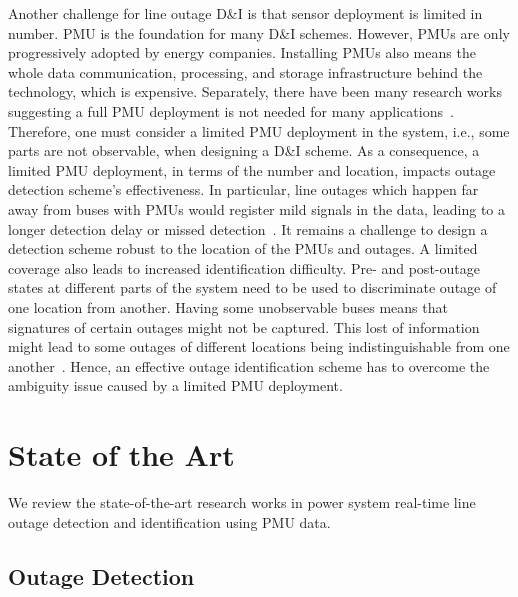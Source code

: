 Another challenge for line outage D\&I is that sensor deployment is limited in number. 
PMU is the foundation for many D\&I schemes. However, PMUs are only progressively adopted by energy companies. Installing PMUs also means the whole data communication, processing, and storage infrastructure behind the technology, which is expensive. Separately, there have been many research works suggesting a full PMU deployment is not needed for many applications~\cite{aminifar2014synchrophasor}. Therefore, one must consider a limited PMU deployment in the system, i.e., some parts are not observable, when designing a D\&I scheme.
As a consequence, a limited PMU deployment, in terms of the number and location, impacts outage detection scheme's effectiveness. In particular, line outages which happen far away from buses with PMUs would register mild signals in the data, leading to a longer detection delay or missed detection~\cite{yang2020control}. It remains a challenge to design a detection scheme robust to the location of the PMUs and outages.
A limited coverage also leads to increased identification difficulty. Pre- and post-outage states at different parts of the system need to be used to discriminate outage of one location from another. Having some unobservable buses means that signatures of certain outages might not be captured. This lost of information might lead to some outages of different locations being indistinguishable from one another~\cite{Wu2015,Costilla-Enriquez2019,yang2021particle}. Hence, an effective outage identification scheme has to overcome the ambiguity issue caused by a limited PMU deployment. 



\section{State of the Art}

We review the state-of-the-art research works in power system real-time line outage detection and identification using PMU data. 

\subsection{Outage Detection} %
\label{sub:outage_detection}

